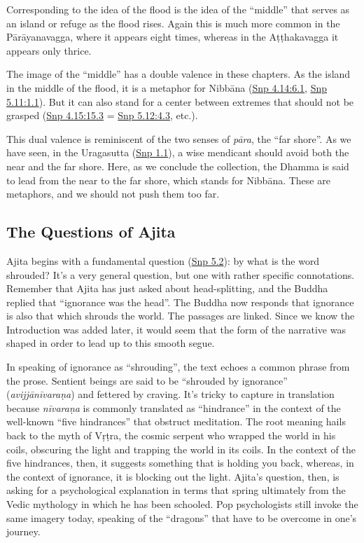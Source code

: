 \documentclass[12pt,openany]{book}%
\begin{document}
Corresponding to the idea of the flood is the idea of the “middle” that serves as an island or refuge as the flood rises. Again this is much more common in the \textsanskrit{Pārāyanavagga}, where it appears eight times, whereas in the \textsanskrit{Aṭṭhakavagga} it appears only thrice.

The image of the “middle” has a double valence in these chapters. As the island in the middle of the flood, it is a metaphor for \textsanskrit{Nibbāna} (\href{https://suttacentral.net/snp4.14/en/sujato\#6.1}{Snp 4.14:6.1}, \href{https://suttacentral.net/snp5.11/en/sujato\#1.1}{Snp 5.11:1.1}). But it can also stand for a center between extremes that should not be grasped (\href{https://suttacentral.net/snp4.15/en/sujato\#15.3}{Snp 4.15:15.3} = \href{https://suttacentral.net/snp5.12/en/sujato\#4.3}{Snp 5.12:4.3}, etc.).

This dual valence is reminiscent of the two senses of \textit{\textsanskrit{pāra}}, the “far shore”. As we have seen, in the Uragasutta (\href{https://suttacentral.net/snp1.1/en/sujato}{Snp 1.1}), a wise mendicant should avoid both the near and the far shore. Here, as we conclude the collection, the Dhamma is said to lead from the near to the far shore, which stands for \textsanskrit{Nibbāna}. These are metaphors, and we should not push them too far.

\subsection*{The Questions of Ajita}

Ajita begins with a fundamental question (\href{https://suttacentral.net/snp5.2/en/sujato}{Snp 5.2}): by what is the word shrouded? It’s a very general question, but one with rather specific connotations. Remember that Ajita has just asked about head-splitting, and the Buddha replied that “ignorance was the head”. The Buddha now responds that ignorance is also that which shrouds the world. The passages are linked. Since we know the Introduction was added later, it would seem that the form of the narrative was shaped in order to lead up to this smooth segue.

In speaking of ignorance as “shrouding”, the text echoes a common phrase from the prose. Sentient beings are said to be “shrouded by ignorance” (\textit{\textsanskrit{avijjānīvaraṇa}}) and fettered by craving. It’s tricky to capture in translation because \textit{\textsanskrit{nīvaraṇa}} is commonly translated as “hindrance” in the context of the well-known “five hindrances” that obstruct meditation. The root meaning hails back to the myth of \textsanskrit{Vṛṭra}, the cosmic serpent who wrapped the world in his coils, obscuring the light and trapping the world in its coils. In the context of the five hindrances, then, it suggests something that is holding you back, whereas, in the context of ignorance, it is blocking out the light. Ajita’s question, then, is asking for a psychological explanation in terms that spring ultimately from the Vedic mythology in which he has been schooled. Pop psychologists still invoke the same imagery today, speaking of the “dragons” that have to be overcome in one’s journey.
\end{document}

